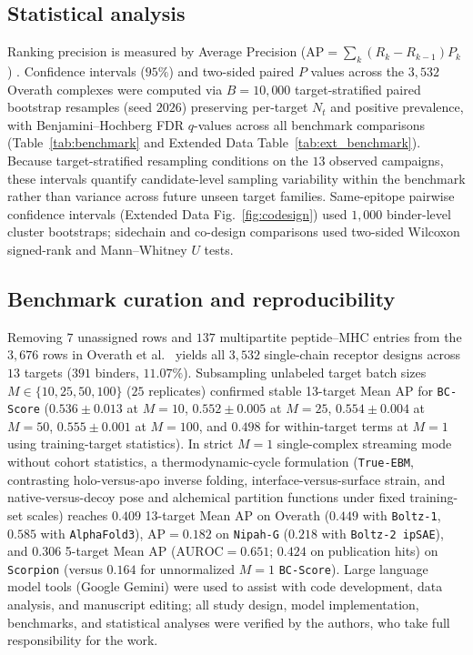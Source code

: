 \documentclass[10pt,twocolumn]{article}
\begin{document}
\subsection{Statistical analysis}
\label{sec:statistics}
Ranking precision is measured by Average Precision ($\text{AP} = \sum_k (R_k - R_{k-1}) P_k$) \cite{overath2025predicting}. Confidence intervals ($95\%$) and two-sided paired $P$ values across the $3,532$ Overath complexes were computed via $B = 10,000$ target-stratified paired bootstrap resamples (seed $2026$) preserving per-target $N_t$ and positive prevalence, with Benjamini--Hochberg FDR $q$-values \cite{benjamini1995fdr} across all benchmark comparisons (Table~\ref{tab:benchmark} and Extended Data Table~\ref{tab:ext_benchmark}). Because target-stratified resampling conditions on the $13$ observed campaigns, these intervals quantify candidate-level sampling variability within the benchmark rather than variance across future unseen target families. Same-epitope pairwise confidence intervals (Extended Data Fig.~\ref{fig:codesign}) used $1,000$ binder-level cluster bootstraps; sidechain and co-design comparisons used two-sided Wilcoxon signed-rank and Mann--Whitney $U$ tests.

\subsection{Benchmark curation and reproducibility}
\label{sec:reproducibility}
Removing $7$ unassigned rows and $137$ multipartite peptide--MHC entries from the $3,676$ rows in Overath et al.\ \cite{overath2025predicting} yields all $3,532$ single-chain receptor designs across $13$ targets ($391$ binders, $11.07\%$). Subsampling unlabeled target batch sizes $M \in \{10, 25, 50, 100\}$ ($25$ replicates) confirmed stable 13-target Mean AP for \texttt{BC-Score} ($0.536 \pm 0.013$ at $M=10$, $0.552 \pm 0.005$ at $M=25$, $0.554 \pm 0.004$ at $M=50$, $0.555 \pm 0.001$ at $M=100$, and $0.498$ for within-target terms at $M=1$ using training-target statistics). In strict $M=1$ single-complex streaming mode without cohort statistics, a thermodynamic-cycle formulation (\texttt{True-EBM}, contrasting holo-versus-apo inverse folding, interface-versus-surface strain, and native-versus-decoy pose and alchemical partition functions under fixed training-set scales) reaches $0.409$ 13-target Mean AP on Overath ($0.449$ with \texttt{Boltz-1}, $0.585$ with \texttt{AlphaFold3}), $\text{AP} = 0.182$ on \texttt{Nipah-G} ($0.218$ with \texttt{Boltz-2 ipSAE}), and $0.306$ 5-target Mean AP ($\text{AUROC} = 0.651$; $0.424$ on publication hits) on \texttt{Scorpion} (versus $0.164$ for unnormalized $M=1$ \texttt{BC-Score}). Large language model tools (Google Gemini) were used to assist with code development, data analysis, and manuscript editing; all study design, model implementation, benchmarks, and statistical analyses were verified by the authors, who take full responsibility for the work.
\end{document}
